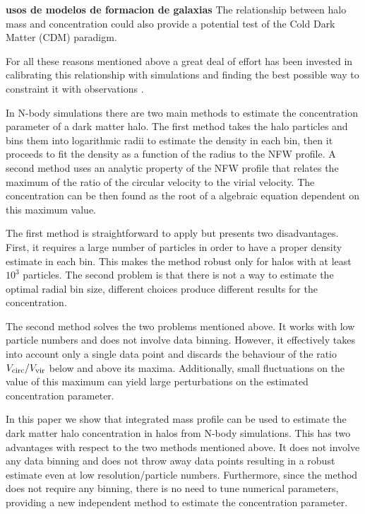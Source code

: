 \documentclass[a4,useAMS,usenatbib,usegraphicx]{mn2e}
\begin{document}
{\bf usos de modelos de formacion de galaxias}
The relationship between halo mass and concentration
could also provide a potential test of the Cold Dark Matter (CDM)
paradigm.  

For all these reasons mentioned above a great deal of effort has
been invested in calibrating this relationship with simulations
\citep{Neto2007,Duffy2008,Munoz2011,Prada2012,Ludlow2014} and finding
the best possible way to constraint it with observations
\citep{Buote2007,Comerford2007,Mandelbaum2008,Giocoli2014,Foex2014,Shan2015}. 

In N-body simulations there are two main methods to estimate the
concentration parameter of a dark matter halo.
The first method takes the halo particles and bins them into
logarithmic radii to estimate the density in each bin, then it 
proceeds to fit the density as a function of the radius to the NFW
profile.  
A second method uses an analytic property of the NFW profile
that relates the maximum of the ratio of the circular velocity to the
virial velocity.  The concentration can be then found as the root of a
algebraic equation dependent on this maximum value.

The first method is straightforward to apply but presents two
disadvantages.  
First, it requires a large number of particles in
order to have a proper density estimate in each bin.  
This makes the method robust only for halos with at least $10^3$ particles.  
The second problem is that there is not a way to estimate the optimal
radial bin size, different choices produce different results for the
concentration.

The second method solves the two problems mentioned above.  
It works with low particle numbers and does not involve data binning.  
However, it effectively takes into account only a single data point and
discards the behaviour of the ratio $V_{\rm circ}/V_{\rm vir}$ below
and above its maxima.  
Additionally, small fluctuations on the value of this maximum can
yield large perturbations on the estimated concentration parameter. 

In this paper we show that integrated mass profile can be used  to
estimate the dark matter halo concentration in halos from N-body
simulations.  
This has two advantages with respect to the two methods mentioned
above.  
It does not involve any data binning and does not throw away data
points resulting in a robust estimate even at low resolution/particle
numbers.  
Furthermore, since the method does not require any binning,
there is no need to tune numerical parameters, providing a new
independent method to estimate the concentration parameter.
\end{document}
